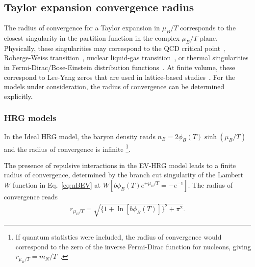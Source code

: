 \documentclass[%
 reprint,
nofootinbib,
 amsmath,amssymb,
 aps,
prc
]{revtex4-2}
\begin{document}
\subsection{Taylor expansion convergence radius}
The radius of convergence for a Taylor expansion in $\mu_B/T$
corresponds to the closest singularity in the partition function in the complex $\mu_B/T$ plane.
Physically, these singularities may correspond to the QCD critical point~\cite{Stephanov:2006dn}, Roberge-Weiss transition~\cite{Oshima:2023bip}, nuclear liquid-gas transition~\cite{Savchuk:2019yxl}, or thermal singularities in Fermi-Dirac/Bose-Einstein distribution functions~\cite{Skokov:2010uc}.
At finite volume, these correspond to Lee-Yang zeros that are used in lattice-based studies~\cite{Connelly:2020pno,Basar:2021gyi, Clarke:2024ugt}. 
For the models under consideration, the radius of convergence can be determined explicitly.

\subsubsection{HRG models}

In the Ideal HRG model, the baryon density reads $n_B = 2 \phi_B(T) \sinh(\mu_B/T)$ and the radius of convergence is infinite
\footnote{If quantum statistics were included, the radius of convergence would correspond to the zero of the inverse Fermi-Dirac function for nucleons, giving $r_{\mu_B/T} = m_N/T$~\cite{Taradiy:2019taz}.}.
 
The presence of repulsive interactions in the EV-HRG model leads to a finite radius of convergence, determined by the branch cut singularity of the Lambert $W$ function in Eq.~\eqref{eq:nBEV} at $W[b \phi_B(T) e^{\pm \mu_B/T} = -e^{-1}]$.
The radius of convergence reads~\cite{Taradiy:2019taz}
\begin{align}
    r_{\mu_B/T} = \sqrt{\{1+ \ln[b\phi_B(T)]\}^2+\pi^2}.
    \label{Eq:radiusEV}
\end{align}
\end{document}
